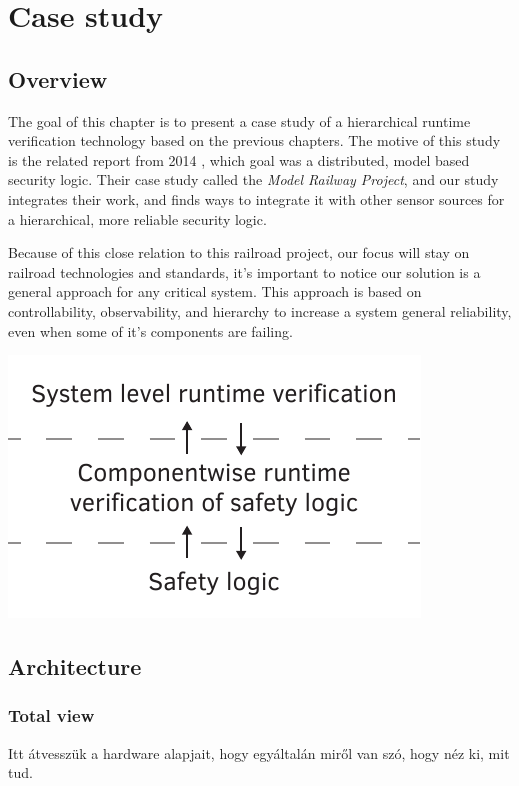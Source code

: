 \chapter{Case study}
\label{chap:case_study}

\section{Overview}

The goal of this chapter is to present a case study of a hierarchical runtime verification technology based on the previous chapters. The motive of this study is the related report from 2014 \citep{tdk2014}, which goal was a distributed, model based security logic. Their case study called the \emph{Model Railway Project}, and our study integrates their work, and finds ways to integrate it with other sensor sources for a hierarchical, more reliable security logic.

Because of this close relation to this railroad project, our focus will stay on railroad technologies and standards, it's important to notice our solution is a general approach for any critical system. This approach is based on controllability, observability, and hierarchy to increase a system general reliability, even when some of it's components are failing.

\begin{minipage}{\textwidth}
	\centering
	\includegraphics[width=0.75\linewidth]{include/figures/chapter_6/overview_1}
\end{minipage}

\section{Architecture}
	\subsection{Total view}
	\label{sec:case_study:total_view}
	Itt átvesszük a hardware alapjait, hogy egyáltalán miről van szó, hogy néz ki, mit tud.
